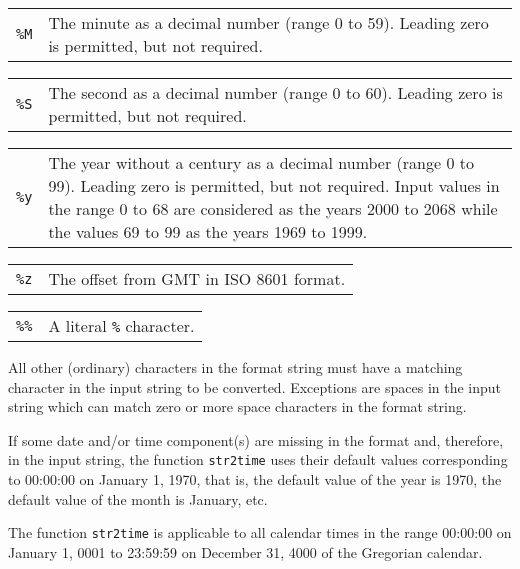\documentclass[10pt]{article}
\begin{document}
\medskip

\begin{tabular}{@{}p{20pt}p{298pt}@{}}
{\tt\%M}&The minute as a decimal number (range 0 to 59). Leading zero
is permitted, but not required.\\
\end{tabular}

\medskip

\begin{tabular}{@{}p{20pt}p{298pt}@{}}
{\tt\%S}&The second as a decimal number (range 0 to 60). Leading zero
is permitted, but not required.\\
\end{tabular}

\medskip

\begin{tabular}{@{}p{20pt}p{298pt}@{}}
{\tt\%y}&The year without a century as a decimal number (range 0 to 99).
Leading zero is permitted, but not required. Input values in the range
0 to 68 are considered as the years 2000 to 2068 while the values 69 to
99 as the years 1969 to 1999.\\
\end{tabular}

\medskip

\begin{tabular}{@{}p{20pt}p{298pt}@{}}
{\tt\%z}&The offset from GMT in ISO 8601 format.\\
\end{tabular}

\medskip

\begin{tabular}{@{}p{20pt}p{298pt}@{}}
{\tt\%\%}&A literal {\tt\%} character.\\
\end{tabular}

\medskip

All other (ordinary) characters in the format string must have a
matching character in the input string to be converted. Exceptions are
spaces in the input string which can match zero or more space
characters in the format string.

If some date and/or time component(s) are missing in the format and,
therefore, in the input string, the function {\tt str2time} uses their
default values corresponding to 00:00:00 on January 1, 1970, that is,
the default value of the year is 1970, the default value of the month
is January, etc.

The function {\tt str2time} is applicable to all calendar times in the
range 00:00:00 on January 1, 0001 to 23:59:59 on December 31, 4000 of
the Gregorian calendar.
\end{document}
